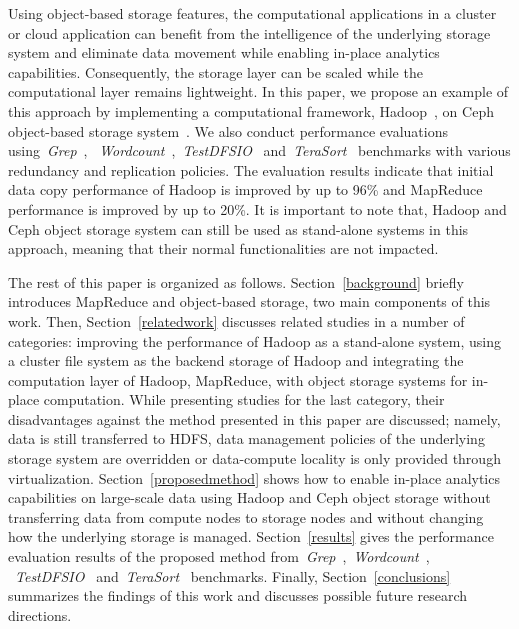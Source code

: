 Using object-based storage features, the computational applications
in a cluster or cloud application can benefit from the intelligence
of the underlying storage system and eliminate data movement while
enabling in-place analytics capabilities. Consequently, the storage
layer can be scaled while the computational layer remains
lightweight. In this paper, we propose
an example of this approach by implementing a computational
framework, Hadoop~\cite{apache_hadoop}, on Ceph object-based
storage system~\cite{cephorig}. We also conduct performance
evaluations using~\textit{Grep}~\cite{hadoopgrep},
~\textit{Wordcount}~\cite{hadoopwordcount},~\textit{TestDFSIO}~\cite{hadooptestdfsio}
and~\textit{TeraSort}~\cite{hadoopterasort} benchmarks
with various redundancy and
replication policies. The evaluation results indicate that initial
data copy performance of Hadoop is improved by up to 96\% and
MapReduce performance is improved by up to 20\%. It is important
to note that, Hadoop and Ceph object storage system can still be
used as stand-alone systems in this approach, meaning that their
normal functionalities are not impacted.

The rest of this paper is organized as follows.
Section~\ref{background} briefly introduces MapReduce and object-based storage,
two main components of this work.
Then, Section~\ref{relatedwork} discusses related studies in a number
of categories: improving the performance of Hadoop as a stand-alone system,
using a cluster file system as the backend storage of Hadoop and integrating
the computation layer of Hadoop, MapReduce, with object storage systems for
in-place computation. While presenting studies for the last category, their
disadvantages against the method presented in this paper are discussed; namely, data is
still transferred to HDFS, data management policies of the underlying storage
system are overridden or data-compute locality is only provided through virtualization.
Section~\ref{proposedmethod} shows how to enable in-place analytics capabilities on
large-scale data using Hadoop and Ceph object storage without transferring data
from compute nodes to storage nodes and without changing how the underlying storage
is managed.
Section~\ref{results} gives the performance evaluation results of the proposed
method from~\textit{Grep}~\cite{hadoopgrep},~\textit{Wordcount}~\cite{hadoopwordcount},
~\textit{TestDFSIO}~\cite{hadooptestdfsio} and~\textit{TeraSort}~\cite{hadoopterasort} benchmarks.
Finally, Section~\ref{conclusions} summarizes the findings of this work
and discusses possible future research directions.
